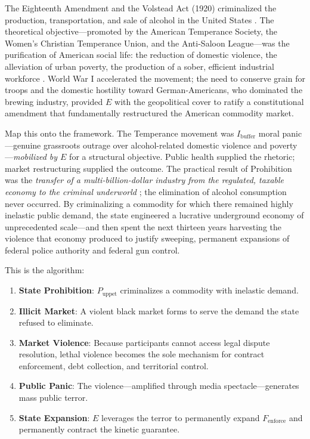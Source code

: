 The Eighteenth Amendment and the Volstead Act (1920) criminalized the production, transportation, and sale of alcohol in the United States \cite{cato_prohibition}. The theoretical objective---promoted by the American Temperance Society, the Women's Christian Temperance Union, and the Anti-Saloon League---was the purification of American social life: the reduction of domestic violence, the alleviation of urban poverty, the production of a sober, efficient industrial workforce \cite{pbs_prohibition}. World War I accelerated the movement; the need to conserve grain for troops and the domestic hostility toward German-Americans, who dominated the brewing industry, provided $E$ with the geopolitical cover to ratify a constitutional amendment that fundamentally restructured the American commodity market.

Map this onto the framework. The Temperance movement was $I_{\text{buffer}}$ moral panic---genuine grassroots outrage over alcohol-related domestic violence and poverty---\textit{mobilized by $E$} for a structural objective. Public health supplied the rhetoric; market restructuring supplied the outcome. The practical result of Prohibition was the \textit{transfer of a multi-billion-dollar industry from the regulated, taxable economy to the criminal underworld} \cite{cato_prohibition}; the elimination of alcohol consumption never occurred. By criminalizing a commodity for which there remained highly inelastic public demand, the state engineered a lucrative underground economy of unprecedented scale---and then spent the next thirteen years harvesting the violence that economy produced to justify sweeping, permanent expansions of federal police authority and federal gun control.

This is the algorithm:

\begin{enumerate}
    \item \textbf{State Prohibition}: $P_{\text{uppet}}$ criminalizes a commodity with inelastic demand.
    \item \textbf{Illicit Market}: A violent black market forms to serve the demand the state refused to eliminate.
    \item \textbf{Market Violence}: Because participants cannot access legal dispute resolution, lethal violence becomes the sole mechanism for contract enforcement, debt collection, and territorial control.
    \item \textbf{Public Panic}: The violence---amplified through media spectacle---generates mass public terror.
    \item \textbf{State Expansion}: $E$ leverages the terror to permanently expand $F_{\text{enforce}}$ and permanently contract the kinetic guarantee.
\end{enumerate}

